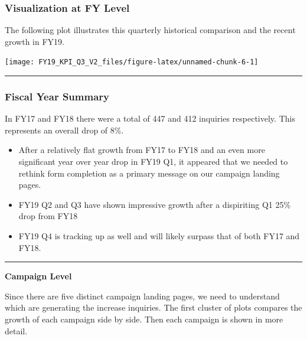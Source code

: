 \documentclass[]{tufte-handout}
\begin{document}
\subsubsection{Visualization at FY
Level}\label{visualization-at-fy-level}

The following plot illustrates this quarterly historical comparison and
the recent growth in FY19.

\texttt{[image: FY19\_KPI\_Q3\_V2\_files/figure-latex/unnamed-chunk-6-1]}

\begin{center}\rule{0.5\linewidth}{\linethickness}\end{center}

\subsubsection{Fiscal Year Summary}\label{fiscal-year-summary}

\begin{marginfigure}
In FY17 and FY18 there were a total of 447 and 412 inquiries
respectively. This represents an overall drop of 8\%.
\end{marginfigure}


\begin{itemize}
\item
  After a relatively flat growth from FY17 to FY18 and an even more
  significant year over year drop in FY19 Q1, it appeared that we needed
  to rethink form completion as a primary message on our campaign
  landing pages.
\item
  FY19 Q2 and Q3 have shown impressive growth after a dispiriting Q1
  25\% drop from FY18
\item
  FY19 Q4 is tracking up as well and will likely surpass that of both
  FY17 and FY18.
\end{itemize}

\begin{center}\rule{0.5\linewidth}{\linethickness}\end{center}

\textbf{Campaign Level}

Since there are five distinct campaign landing pages, we need to
understand which are generating the increase inquiries. The first
cluster of plots compares the growth of each campaign side by side. Then
each campaign is shown in more detail.
\end{document}

